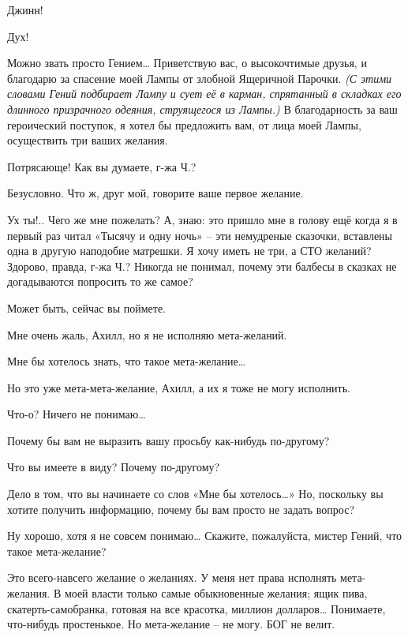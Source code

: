 \documentclass[../main.tex]{subfiles}
\begin{document}
\begin{Dialogue}
\begin{sublevel}
\begin{sublevel}
 Джинн!

 Дух!

 Можно звать просто Гением\ldots{} Приветствую вас, о высокочтимые друзья, и благодарю за спасение моей Лампы от злобной Ящеричной Парочки. \emph{(С этими словами Гений подбирает Лампу и сует её в карман, спрятанный в складках его длинного призрачного одеяния, струящегося из Лампы.)} В благодарность за ваш героический поступок, я хотел бы предложить вам, от лица моей Лампы, осуществить три ваших желания.

 Потрясающе! Как вы думаете, г-жа Ч.\@?

 Безусловно. Что ж, друг мой, говорите ваше первое желание.

 Ух ты!.. Чего же мне пожелать? А, знаю: это пришло мне в голову ещё когда я в первый раз читал «Тысячу и одну ночь» \--- эти немудреные сказочки, вставлены одна в другую наподобие матрешки. Я хочу иметь не три, а СТО желаний? Здорово, правда, г-жа Ч.\@? Никогда не понимал, почему эти балбесы в сказках не догадываются попросить то же самое?

 Может быть, сейчас вы поймете.

 Мне очень жаль, Ахилл, но я не исполняю мета-желаний.

 Мне бы хотелось знать, что такое мета-желание\ldots{}

 Но это уже мета-мета-желание, Ахилл, а их я тоже не могу исполнить.

 Что-о? Ничего не понимаю\ldots{}

 Почему бы вам не выразить вашу просьбу как-нибудь по-другому?

 Что вы имеете в виду? Почему по-другому?

 Дело в том, что вы начинаете со слов «Мне бы хотелось\ldots» Но, поскольку вы хотите получить информацию, почему бы вам просто не задать вопрос?

 Ну хорошо, хотя я не совсем понимаю\ldots{} Скажите, пожалуйста, мистер Гений, что такое мета-желание?

 Это всего-навсего желание о желаниях. У меня нет права исполнять мета-желания. В моей власти только самые обыкновенные желания; ящик пива, скатерть-самобранка, готовая на все красотка, миллион долларов\ldots{} Понимаете, что-нибудь простенькое. Но мета-желание \--- не могу. БОГ не велит.


\end{sublevel}
\end{sublevel}
\end{Dialogue}
\end{document}
